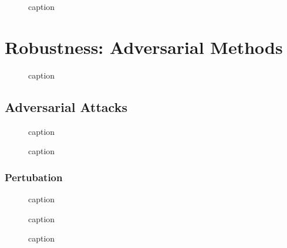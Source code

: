 \documentclass[11pt]{article}
\begin{document}
\begin{figure}[H]
    \centering
    \caption{caption}
\end{figure}

\section{Robustness: Adversarial Methods}

\begin{figure}[H]
    \centering
    \caption{caption}
\end{figure}

\subsection{Adversarial Attacks}

\begin{figure}[H]
    \centering
    \caption{caption}
\end{figure}

\begin{figure}[H]
    \centering
    \caption{caption}
\end{figure}

\subsubsection{Pertubation}

\begin{figure}[H]
    \centering
    \caption{caption}
\end{figure}

\begin{figure}[H]
    \centering
    \caption{caption}
\end{figure}

\begin{figure}[H]
    \centering
    \caption{caption}
\end{figure}
\end{document}
